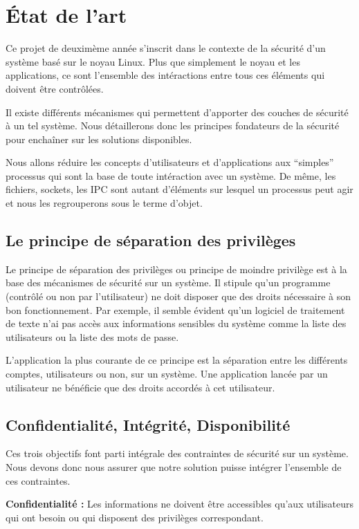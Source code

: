 \section{\'Etat de l'art}

Ce projet de deuximème année s'inscrit dans le contexte de la sécurité d'un système basé sur le noyau Linux. Plus que simplement le noyau et les applications, ce sont l'ensemble des intéractions entre tous ces éléments qui doivent être contrôlées.

Il existe différents mécanismes qui permettent d'apporter des couches de sécurité à un tel système. Nous détaillerons donc les principes fondateurs de la sécurité pour enchaîner sur les solutions disponibles.

Nous allons réduire les concepts d'utilisateurs et d'applications aux ``simples'' processus qui sont la base de toute intéraction avec un système. De même, les fichiers, sockets, les IPC sont autant d'éléments sur lesquel un processus peut agir et nous les regrouperons sous le terme d'objet.

\subsection{Le principe de séparation des privilèges}

Le principe de séparation des privilèges ou principe de moindre privilège est à la base des mécanismes de sécurité sur un système. Il stipule qu'un programme (contrôlé ou non par l'utilisateur) ne doit disposer que des droits nécessaire à son bon fonctionnement. Par exemple, il semble évident qu'un logiciel de traitement de texte n'ai pas accès aux informations sensibles du système comme la liste des utilisateurs ou la liste des mots de passe.

L'application la plus courante de ce principe est la séparation entre les différents comptes, utilisateurs ou non, sur un système. Une application lancée par un utilisateur ne bénéficie que des droits accordés à cet utilisateur.

\subsection{Confidentialité, Intégrité, Disponibilité}

Ces trois objectifs font parti intégrale des contraintes de sécurité sur un système. Nous devons donc nous assurer que notre solution puisse intégrer l'ensemble de ces contraintes.

\textbf{Confidentialité :}
Les informations ne doivent être accessibles qu'aux utilisateurs qui ont besoin ou qui disposent des privilèges correspondant.

